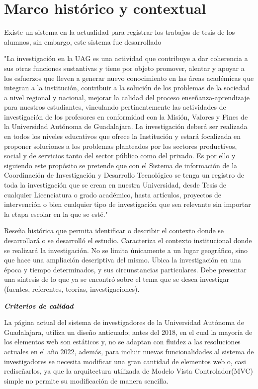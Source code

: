 
\section{Marco histórico y contextual}

    Existe un sistema en la actualidad para registrar los trabajos de tesis de los alumnos, sin embargo, este sistema fue desarrollado 
    
    "La investigación en la UAG es una actividad que contribuye a dar coherencia a sus otras funciones sustantivas y tiene por objeto promover, alentar y apoyar a los esfuerzos que lleven a generar nuevo conocimiento en las áreas académicas que integran a la institución, contribuir a la solución de los problemas de la sociedad a nivel regional y nacional, mejorar la calidad del proceso enseñanza-aprendizaje para nuestros estudiantes, vinculando pertinentemente las actividades de investigación de los profesores en conformidad con la Misión, Valores y Fines de la Universidad Autónoma de Guadalajara.
    La investigación deberá ser realizada en todos los niveles educativos que ofrece la Institución y estará focalizada en proponer soluciones a los problemas planteados por los sectores productivos, social y de servicios tanto del sector público como del privado. Es por ello y siguiendo este propósito se pretende que con el Sistema de información de la Coordinación de Investigación y Desarrollo Tecnológico se tenga un registro de toda la investigación que se crean en nuestra Universidad, desde Tesis de cualquier Licenciatura o grado académico, hasta artículos, proyectos de intervención o bien cualquier tipo de investigación que sea relevante sin importar la etapa escolar en la que se esté."\cite{UAG}
    
    
    
    
    Reseña histórica que permita identificar o describir el contexto donde se desarrollará o se desarrolló el estudio.
    Caracteriza el contexto institucional donde se realizará la investigación. No se limita únicamente a un lugar geográfico, sino que hace una ampliación descriptiva del mismo.
    Ubica la investigación en una época y tiempo determinados, y sus circunstancias particulares.
    Debe presentar una síntesis de lo que ya se encontró sobre el tema que se desea investigar (fuentes, referentes, teorías, investigaciones).
    
    \textbf{\textit{Criterios de calidad}}
    
    La página actual del sistema de investigadores de la Universidad Autónoma de Guadalajara, utiliza un diseño anticuado; antes del 2018, en el cual la mayoría de los elementos web son estáticos y, no se adaptan con fluidez a las resoluciones actuales en el año 2022, además, para incluir nuevas funcionalidades al sistema de investigadores se necesita modificar una gran cantidad de elementos web o, casi rediseñarlos, ya que la arquitectura utilizada de Modelo Vista Controlador(MVC) simple no permite su modificación de manera sencilla.
    
